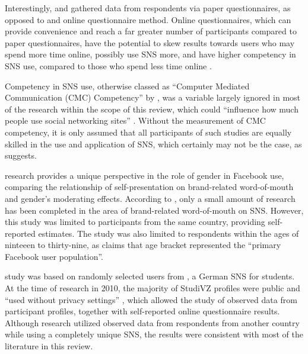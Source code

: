 Interestingly, \citet{Raacke2008} and \citet{Joiner2014} gathered data from respondents via paper questionnaires, as opposed to  and  online questionnaire method. Online questionnaires, which can provide convenience and reach a far greater number of participants compared to paper questionnaires, have the potential to skew results towards users who may spend more time online, possibly use SNS more, and have higher competency in SNS use, compared to those who spend less time online \citep[p. 280]{Hargittai2007}.

Competency in SNS use, otherwise classed as ``Computer Mediated Communication (CMC) Competency'' by \citet[p. 579]{Ross2009}, was a variable largely ignored in most of the research within the scope of this review, which could ``influence how much people use social networking sites'' \citep[p. 898]{Kimbrough2013}. Without the measurement of CMC competency, it is only assumed that all participants of such studies are equally skilled in the use and application of SNS, which certainly may not be the case, as \citet{Ross2009} suggests.

 research provides a unique perspective in the role of gender in Facebook use, comparing the relationship of self-presentation on brand-related word-of-mouth and gender's moderating effects. According to \citet{Choi2014}, only a small amount of research has been completed in the area of brand-related word-of-mouth on SNS. However, this study was limited to participants from the same country, providing self-reported estimates. The study was also limited to respondents within the ages of ninteeen to thirty-nine, as \citet[p. 3]{Choi2014} claims that age bracket represented the ``primary Facebook user population''.

 study was based on randomly selected users from \citet{StudiVZ2014}, a German SNS for students. At the time of research in 2010, the majority of StudiVZ profiles were public and ``used without privacy settings'' \citep[p. 92]{Haferkamp2012}, which allowed the study of observed data from participant profiles, together with self-reported online questionnaire results. Although  research utilized observed data from respondents from another country while using a completely unique SNS, the results were consistent with most of the literature in this review.